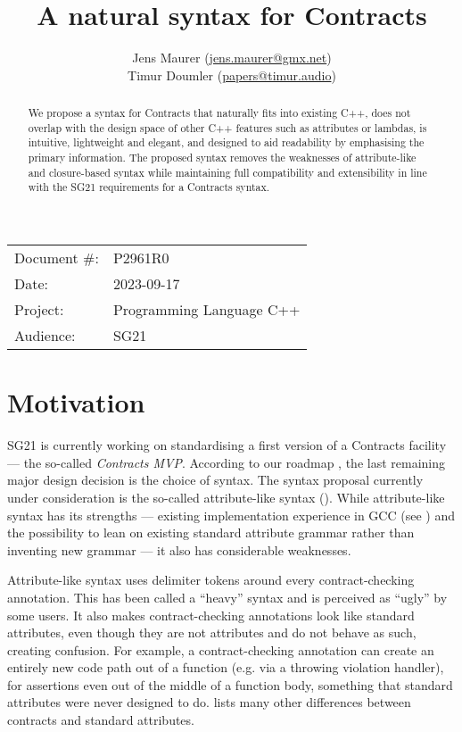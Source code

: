 


\title{A natural syntax for Contracts}
\author{ Jens Maurer \small(\href{mailto:jens.maurer@gmx.net}{jens.maurer@gmx.net}) \\
 Timur Doumler \small(\href{mailto:papers@timur.audio}{papers@timur.audio})}
\date{}
\maketitle

\begin{tabular}{ll}
Document \#: & P2961R0 \\
Date: &2023-09-17 \\
Project: & Programming Language C++ \\
Audience: & SG21
\end{tabular}

\begin{abstract}
We propose a syntax for Contracts that naturally fits into existing C++, does not overlap with the design space of other C++ features such as attributes or lambdas, is intuitive, lightweight and elegant, and designed to aid readability by emphasising the primary information. The proposed syntax removes the weaknesses of attribute-like and closure-based syntax while maintaining full compatibility and extensibility in line with the SG21 requirements for a Contracts syntax.
\end{abstract}

\section{Motivation}
\label{sec:motivation}

SG21 is currently working on standardising a first version of a Contracts facility --- the so-called \emph{Contracts MVP}. According to our roadmap \cite{P2695R1}, the last remaining major design decision is the choice of syntax. The syntax proposal currently under consideration is the so-called attribute-like syntax (\cite{P2935R0}). While attribute-like syntax has its strengths --- existing implementation experience in GCC (see \cite{P1680R0}) and the possibility to lean on existing standard attribute grammar rather than inventing new grammar --- it also has considerable weaknesses.

Attribute-like syntax uses \tcode{[[ ... ]]} delimiter tokens around every contract-checking annotation. This has been called a ``heavy'' syntax and is  perceived as ``ugly'' by some users. It also makes contract-checking annotations look like standard attributes, even though they are not attributes and do not behave as such, creating confusion. For example, a contract-checking annotation can create an entirely new code path out of a function (e.g. via a throwing violation handler), for assertions even out of the middle of a function body, something that standard attributes were never designed to do. \cite{P2487R1} lists many other differences between contracts and standard attributes.

